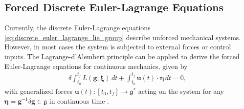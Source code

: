 \subsection{Forced Discrete Euler-Lagrange Equations}
\label{sec:discrete_forced_lagrangian}

Currently, the discrete Euler-Lagrange equations \eqref{eq:discrete_euler_lagrange_lie_group} describe unforced mechanical systems. 
However, in most cases the system is subjected to external forces or control inputs. The Lagrange-d'Alembert principle can be applied to derive the forced 
Euler-Lagrange equations for continuous mechanics, given by
\begin{align}
    \delta \int_{t_0}^{t_f} L(\bm{g}, \bm{\xi})\, dt + \int_{t_0}^{t_f} \bm{u}(t) \cdot \bm{\eta}\, dt = 0,
\end{align}
with generalized forces $\bm{u}(t):[t_0, t_f] \to \mathfrak{g}^*$ acting on the system for any $\bm{\eta}=\bm{g}^{-1}\delta\bm{g}\in\mathfrak{g}$ in continuous time \cite{Lee2008}. 

